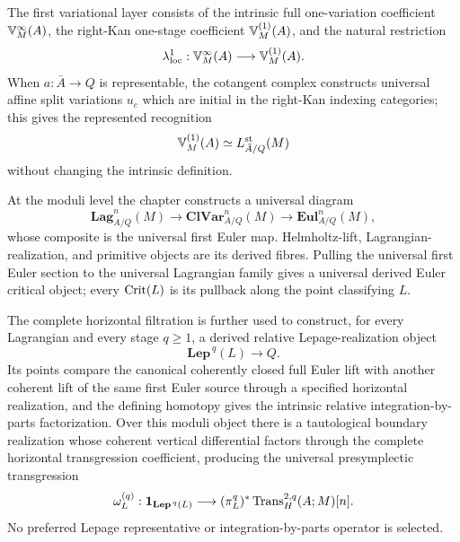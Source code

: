 The first variational layer consists of the intrinsic full one-variation coefficient \(\mathbb V^{\infty}_M(A)\), the right-Kan one-stage coefficient \(\mathbb V^{(1)}_M(A)\), and the natural restriction
\[
    \lambda^1_{\mathrm{loc}}:
    \mathbb V^{\infty}_M(A)\longrightarrow\mathbb V^{(1)}_M(A).
\]
When \(a:\bar A\to Q\) is representable, the cotangent complex constructs universal affine split variations \(u_c\) which are initial in the right-Kan indexing categories; this gives the represented recognition
\[
    \mathbb V^{(1)}_M(A)
    \simeq
    L^{\mathrm{st}}_{\bar A/Q}(M)
\]
without changing the intrinsic definition.

At the moduli level the chapter constructs a universal diagram
\[
    \boxed{
    \mathbf{Lag}^n_{A/Q}(M)
    \longrightarrow
    \mathbf{ClVar}^n_{A/Q}(M)
    \longrightarrow
    \mathbf{Eul}^n_{A/Q}(M),
    }
\]
whose composite is the universal first Euler map. Helmholtz-lift, Lagrangian-realization, and primitive objects are its derived fibres. Pulling the universal first Euler section to the universal Lagrangian family gives a universal derived Euler critical object; every \(\operatorname{Crit}(L)\) is its pullback along the point classifying \(L\).

The complete horizontal filtration is further used to construct, for every Lagrangian and every stage \(q\ge1\), a derived relative Lepage-realization object
\[
    \mathbf{Lep}^{\,q}(L)\longrightarrow Q.
\]
Its points compare the canonical coherently closed full Euler lift with another coherent lift of the same first Euler source through a specified horizontal realization, and the defining homotopy gives the intrinsic relative integration-by-parts factorization.  Over this moduli object there is a tautological boundary realization whose coherent vertical differential factors through the complete horizontal transgression coefficient, producing the universal presymplectic transgression
\[
    \omega_L^{(q)}:
    \mathbf 1_{\mathbf{Lep}^{\,q}(L)}
    \longrightarrow
    (\pi_L^q)^*\operatorname{Trans}_{H}^{2,q}(A;M)[n].
\]
No preferred Lepage representative or integration-by-parts operator is selected.

